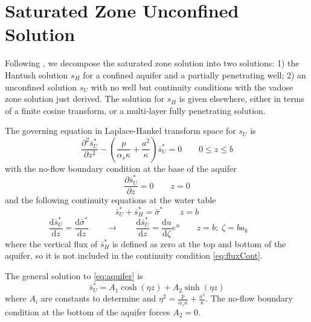 \documentclass[11pt]{article}
\begin{document}
\section{Saturated Zone Unconfined Solution}
Following \cite{mishra10}, we decompose the saturated zone solution into two solutions: 1) the Hantush solution $s_H$ for a confined aquifer and a partially penetrating well; 2) an unconfined solution $s_U$ with no well but continuity conditions with the vadose zone solution just derived.  The solution for $s_H$ is given elsewhere, either in terms of a finite cosine transform, or a multi-layer fully penetrating solution.  

The governing equation  in Laplace-Hankel transform space for $s_U$ is
\begin{equation}
  \label{eq:aquifer}
  \frac{\partial^2 \bar{s}_U^{\ast}}{\partial z^2} - \left( \frac{p}{\alpha_s \kappa} + \frac{a^2}{\kappa} \right)\bar{s}_U^{\ast} = 0 \qquad 0 \le z \le b
\end{equation}
with the no-flow boundary condition at the base of the aquifer
$$ \frac{\partial \bar{s}_U^{\ast}}{\partial z} = 0 \qquad z=0 $$
and the following continuity equations at the water table
\begin{equation}
  \label{eq:headCont}
  \bar{s}_U^{\ast} + \bar{s}_H^{\ast} = \bar{\sigma}^{\ast} \qquad z=b
\end{equation}
\begin{equation}
  \label{eq:fluxCont}
  \frac{\mathrm{d} \bar{s}_U^{\ast}}{\mathrm{d} z}  = \frac{\mathrm{d}
    \bar{\sigma}^{\ast}}{\mathrm{d} z} \qquad \rightarrow \qquad \frac{\mathrm{d} \bar{s}_U^{\ast}}{\mathrm{d} z}  = \frac{\mathrm{d}u}{\mathrm{d} \zeta} e^u \qquad z=b; \; \zeta=b a_k
  \qquad 
\end{equation}
where the vertical flux of $\bar{s}_H^{\ast}$ is defined as zero at
the top and bottom of the aquifer, so it is not included in the
continuity condition \eqref{eq:fluxCont}.

The general solution to \eqref{eq:aquifer} is 
\begin{equation}
  \label{eq:su}
  \bar{s}_U^{\ast} = A_1 \cosh(\eta z) + A_2 \sinh(\eta z)
\end{equation}
where $A_i$ are constants to determine and $\eta^2 = \frac{p}{\alpha_s \kappa} + \frac{a^2}{\kappa}$.  The no-flow boundary condition at the bottom of the aquifer forces $A_2=0$.  
\end{document}
